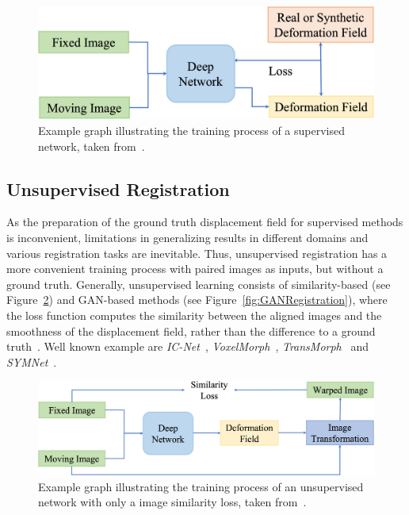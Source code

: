 \documentclass[english,version-2022-01]{uzl-thesis} %
\begin{document}
\begin{figure}[h] %
	\centering
	\graphicspath{{images/}{\main/images/}}
	\includegraphics[width=\linewidth]{SupervisedRegistrationGraph.jpg} 
	\caption{Example graph illustrating the training process of a supervised network, taken from~\cite{Zou2022}.}
	\label{fig:SupervisedRegistration}
\end{figure}


\subsection{Unsupervised Registration} \label{SubSec:UnsupervisedRegistration}
As the preparation of the ground truth displacement field for supervised methods is inconvenient, limitations in generalizing results in different domains and various registration tasks are inevitable. Thus, unsupervised registration has a more convenient training process with paired images as inputs, but without a ground truth. Generally, unsupervised learning consists of similarity-based (see Figure~\ref{fig:UnsupervisedRegistration}) and GAN-based methods (see Figure~\ref{fig:GANRegistration}), where the loss function computes the similarity between the aligned images and the smoothness of the displacement field, rather than the difference to a ground truth~\cite{Zou2022}. Well known example are \emph{IC-Net}~\cite{IC-Net},  \emph{VoxelMorph}~\cite{Voxelmorph}, \emph{TransMorph}~\cite{TransMorph} and \emph{SYMNet}~\cite{SYM-Net}.

\begin{figure}[h] %
	\centering
	\graphicspath{{images/}{\main/images/}}
	\includegraphics[width=\linewidth]{UnsupervisedRegistrationGraph.jpg} 
	\caption{Example graph illustrating the training process of an unsupervised network with only a image similarity loss, taken from~\cite{Zou2022}.}
	\label{fig:UnsupervisedRegistration}
\end{figure}
\end{document}
